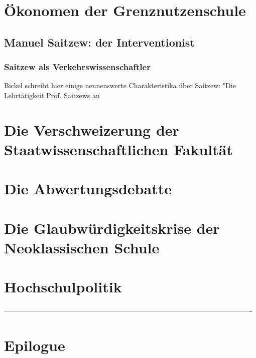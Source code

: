 \documentclass[12pt,a4paper,bibliography=totocnumbered,listof=totocnumbered]{scrartcl}
\begin{document}
\section{Ökonomen der Grenznutzenschule}
\subsection{Manuel Saitzew: der Interventionist}
\subsubsection{Saitzew als Verkehrswissenschaftler}
%

\citep{SaitzewGeburi} Bickel schreibt hier einige nennenswerte Charakteristika über Saitzew: "Die Lehrtätigkeit Prof. Saitzews an 
\\


\section{Die Verschweizerung der Staatwissenschaftlichen Fakultät}
\section{Die Abwertungsdebatte}
\section{Die Glaubwürdigkeitskrise der Neoklassischen Schule}

\section{Hochschulpolitik} ----------------------------------------------------------------------------------------------------------
\section{Epilogue}


\end{document}
